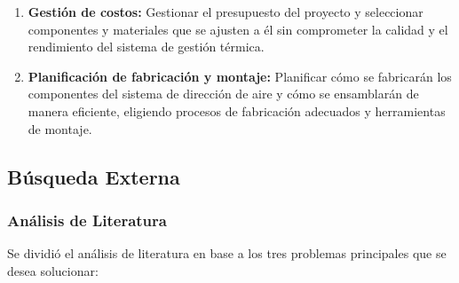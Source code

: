 \begin{enumerate}[label=\alph*)]
\begin{enumerate}[label=\Roman*)]
        \needspace{3cm}
        \item \textbf{Gestión de costos:} Gestionar el presupuesto del proyecto y seleccionar componentes y materiales que se ajusten a él sin comprometer la calidad y el rendimiento del sistema de gestión térmica.

        \needspace{3cm}
        \item \textbf{Planificación de fabricación y montaje:} Planificar cómo se fabricarán los componentes del sistema de dirección de aire y cómo se ensamblarán de manera eficiente, eligiendo procesos de fabricación adecuados y herramientas de montaje.
    \end{enumerate}
\end{enumerate}

\needspace{3cm}
\subsection{Búsqueda Externa}
\subsubsection{Análisis de Literatura}
Se dividió el análisis de literatura en base a los tres problemas principales que se desea solucionar:

